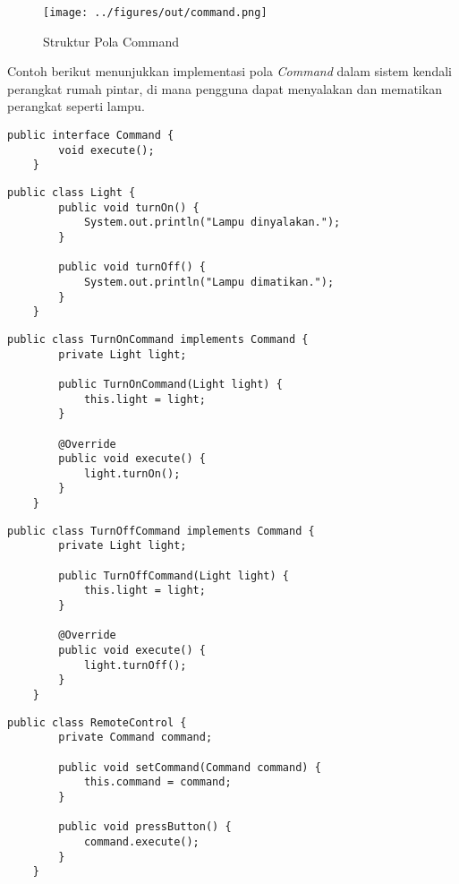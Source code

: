 \begin{figure}[h]
	\centering
		\texttt{[image: ../figures/out/command.png]}
	\caption{Struktur Pola Command}
	\label{fig:command}
\end{figure}

Contoh berikut menunjukkan implementasi pola \textit{Command} dalam sistem kendali perangkat rumah pintar, di mana pengguna dapat menyalakan dan mematikan perangkat seperti lampu.

\begin{lstlisting}[style=JavaStyle, caption={Antarmuka Command}, label={lst:command-interface}]
	public interface Command {
		void execute();
	}
\end{lstlisting}

\begin{lstlisting}[style=JavaStyle, caption={Receiver: Lampu}, label={lst:command-receiver}]
	public class Light {
		public void turnOn() {
			System.out.println("Lampu dinyalakan.");
		}
		
		public void turnOff() {
			System.out.println("Lampu dimatikan.");
		}
	}
\end{lstlisting}

\begin{lstlisting}[style=JavaStyle, caption={ConcreteCommand: Perintah Menyalakan Lampu}, label={lst:command-on}]
	public class TurnOnCommand implements Command {
		private Light light;
		
		public TurnOnCommand(Light light) {
			this.light = light;
		}
		
		@Override
		public void execute() {
			light.turnOn();
		}
	}
\end{lstlisting}

\begin{lstlisting}[style=JavaStyle, caption={ConcreteCommand: Perintah Mematikan Lampu}, label={lst:command-off}]
	public class TurnOffCommand implements Command {
		private Light light;
		
		public TurnOffCommand(Light light) {
			this.light = light;
		}
		
		@Override
		public void execute() {
			light.turnOff();
		}
	}
\end{lstlisting}

\begin{lstlisting}[style=JavaStyle, caption={Invoker: Remote Control}, label={lst:command-invoker}]
	public class RemoteControl {
		private Command command;
		
		public void setCommand(Command command) {
			this.command = command;
		}
		
		public void pressButton() {
			command.execute();
		}
	}
\end{lstlisting}

